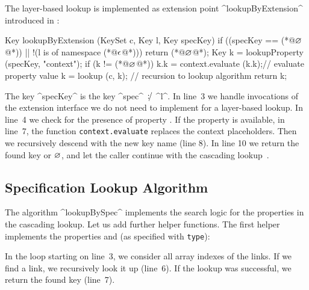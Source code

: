 The layer-based lookup is implemented as extension point ^lookupByExtension^ introduced in :

\label{sec:approach-context-aware-lookup}
\begin{code}[language=Cpp,morekeywords={is,of},escapeinside={(*@}{@*)}]
Key lookupByExtension (KeySet c, Key l, Key specKey)
{
	if ((specKey == (*@$\varnothing$@*)) || !(l is of namespace (*@$\epsilon$@*))) return (*@$\varnothing$@*);
	Key k = lookupProperty (specKey, "context");
	if (k != (*@$\varnothing$@*))
	{
		k.k = context.evaluate (k.k);// evaluate property value
		k   = lookup (c, k);   // recursion to lookup algorithm
	}
	return k;
}
\end{code}

The key ^specKey^ is the key ^spec^ $\operatorname*{\mathnormal{\colon\!\!\!/}}$ ^l^.
In line~3 we handle invocations of the extension interface we do not need to implement for a layer-based lookup.
In line~4 we check for the presence of property .
If the property is available, in line~7, the function \texttt{context.evaluate} replaces the context placeholders.
Then we recursively descend with the new key name (line 8).
In line 10 we return the found key or $\varnothing$, and let the caller continue with the cascading lookup~\cite{raab2016unanticipated}.

\subsection{Specification Lookup Algorithm}

The algorithm ^lookupBySpec^ implements the search logic for the properties in the cascading lookup.
Let us add further helper functions.
The first helper implements the properties  and  (as specified with \texttt{type}):


In the loop starting on line~3, we consider all array indexes of the links.
If we find a link, we recursively look it up (line~6).
If the lookup was successful, we return the found key (line~7).


